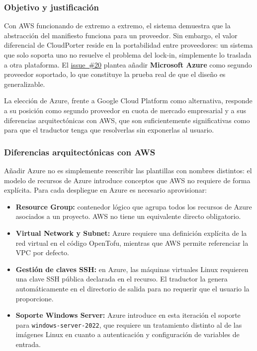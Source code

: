 \subsubsection{Objetivo y justificación}

Con AWS funcionando de extremo a extremo, el sistema demuestra que la abstracción del
manifiesto funciona para un proveedor. Sin embargo, el valor diferencial de CloudPorter
reside en la portabilidad entre proveedores: un sistema que solo soporta uno no resuelve
el problema del lock-in, simplemente lo traslada a otra plataforma. El \href{https://github.com/lucpez/cloudporter/issues/20}{issue~\#20} plantea
añadir \textbf{Microsoft Azure} como segundo proveedor soportado, lo que constituye la
prueba real de que el diseño es generalizable.

La elección de Azure, frente a Google Cloud Platform como alternativa, responde a su posición
como segundo proveedor en cuota de mercado empresarial y a sus diferencias arquitectónicas
con AWS, que son suficientemente significativas como para que el traductor tenga que resolverlas
sin exponerlas al usuario.

\subsubsection{Diferencias arquitectónicas con AWS}

Añadir Azure no es simplemente reescribir las plantillas con nombres distintos: el modelo de
recursos de Azure introduce conceptos que AWS no requiere de forma explícita. Para cada
despliegue en Azure es necesario aprovisionar:

\begin{itemize}
    \item \textbf{Resource Group:} contenedor lógico que agrupa todos los recursos de Azure
    asociados a un proyecto. AWS no tiene un equivalente directo obligatorio.
    \item \textbf{Virtual Network y Subnet:} Azure requiere una definición explícita de la
    red virtual en el código OpenTofu, mientras que AWS permite referenciar la VPC por defecto.
    \item \textbf{Gestión de claves SSH:} en Azure, las máquinas virtuales Linux requieren
    una clave SSH pública declarada en el recurso. El traductor la genera automáticamente
    en el directorio de salida para no requerir que el usuario la proporcione.
    \item \textbf{Soporte Windows Server:} Azure introduce en esta iteración el soporte para
    \texttt{windows-server-2022}, que requiere un tratamiento distinto al de las imágenes
    Linux en cuanto a autenticación y configuración de variables de entrada.
\end{itemize}

